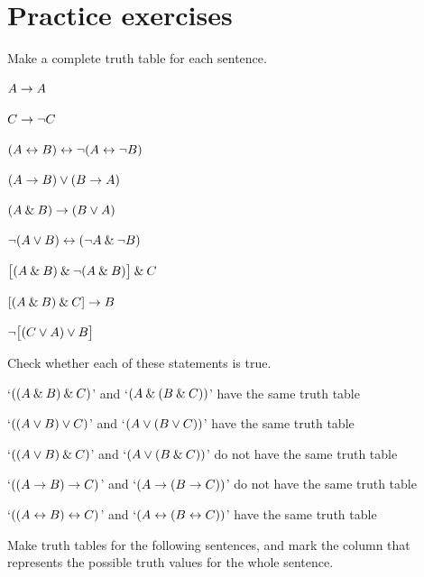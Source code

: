 \newpage

\section{Practice exercises}\label{pr.TT.TTorC}
\setcounter{ProbPart}{0}

\problempart
Make a complete truth table for each sentence.
\begin{earg}
\item $A \rightarrow A$ %
\item $C \rightarrow{\neg} C$ %
\item $(A \leftrightarrow B) \leftrightarrow {\neg}(A\leftrightarrow {\neg} B)$ %
\item $(A \rightarrow B) \vee (B \rightarrow A)$ %
\item $(A \mathbin{\&} B) \rightarrow (B \vee A)$  %
\item ${\neg}(A \vee B) \leftrightarrow ({\neg} A \mathbin{\&} {\neg} B)$ %
\item $\bigl[(A\mathbin{\&} B) \mathbin{\&}{\neg}(A\mathbin{\&} B)\bigr] \mathbin{\&} C$ %
\item $[(A \mathbin{\&} B) \mathbin{\&} C] \rightarrow B$ %
\item ${\neg}\bigl[(C\vee A) \vee B\bigr]$ %
\end{earg}

\problempart
Check whether each of these statements is true.
\begin{earg}
	\item `$((A \mathbin{\&} B) \mathbin{\&} C)$' and `$(A \mathbin{\&} (B \mathbin{\&} C))$' have the same truth table
	\item `$((A \vee B) \vee C)$' and `$(A \vee (B \vee C))$' have the same truth table
	\item `$((A \vee B) \mathbin{\&} C)$' and `$(A \vee (B \mathbin{\&} C))$' do not have the same truth table
	\item `$((A \rightarrow B) \rightarrow C)$' and `$(A \rightarrow (B \rightarrow C))$' do not have the same truth table
	\item `$((A \leftrightarrow B) \leftrightarrow C)$' and `$(A \leftrightarrow (B \leftrightarrow C))$' have the same truth table
\end{earg}

\problempart
Make truth tables for the following sentences, and mark the column that represents the possible truth values for the whole sentence.

